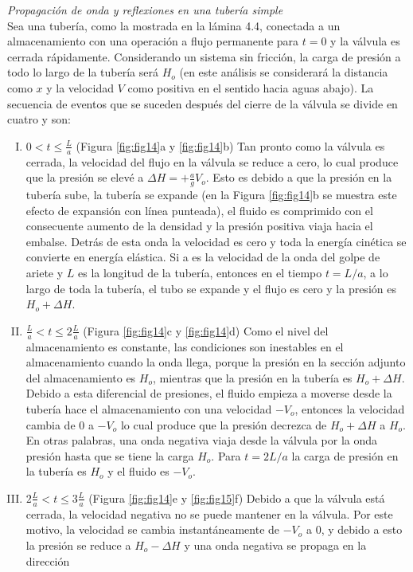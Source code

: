 \documentclass[letterpaper]{report}
\begin{document}
\emph{Propagación de onda y reflexiones en una tubería simple}\\
Sea una tubería, como la mostrada en la lámina 4.4, conectada a un almacenamiento con una operación a flujo permanente para $t=0$ y la válvula es cerrada rápidamente. 
Considerando un sistema sin fricción, la carga de presión a todo lo largo de la tubería será $H_o$ (en este análisis se considerará la distancia como $x$ y la velocidad 
$V$ como positiva en el sentido hacia aguas abajo).
La secuencia de eventos que se suceden después del cierre de la válvula se divide en cuatro y son:
\begin{enumerate}[I.]
	\item $0<t\le\frac{L}{a}$ (Figura \ref{fig:fig14}a y \ref{fig:fig14}b) Tan pronto como la válvula es cerrada, la velocidad del flujo en la válvula se reduce a cero, lo cual produce que la 
	presión se elevé a $\Delta H = + \frac{a}{g}V_o$. Esto es debido a que la presión en la tubería sube, la tubería se expande (en la Figura \ref{fig:fig14}b se muestra este efecto de 
	expansión con línea punteada), el fluido es comprimido con el consecuente aumento de la densidad y la presión positiva viaja hacia el embalse. Detrás de esta onda la 
	velocidad es cero y toda la energía cinética se convierte en energía elástica. Si a es la velocidad de la onda del golpe de ariete y $L$ es la longitud de la tubería, 
	entonces en el tiempo $t=L/a$, a lo largo de toda la tubería, el tubo se expande y el flujo es cero y la presión es $H_o+\Delta H$.
	\item $\frac{L}{a} < t \le 2\frac{L}{a}$ (Figura \ref{fig:fig14}c y \ref{fig:fig14}d) Como el nivel del almacenamiento es constante, las condiciones son inestables en el almacenamiento cuando 
	la onda llega, porque la presión en la sección adjunto del almacenamiento es $H_o$, mientras que la presión en la tubería es $H_o+\Delta H$. Debido a esta diferencial de presiones, 
	el fluido empieza a moverse desde la tubería hace el almacenamiento con una velocidad $-V_o$, entonces la velocidad cambia de 0 a $-V_o$ lo cual produce que la presión decrezca 
	de $H_o+\Delta H$ a $H_o$. En otras palabras, una onda negativa viaja desde la válvula por la onda presión hasta que se tiene la carga $H_o$. Para $t = 2L/a$ la carga de presión en 
	la tubería es $H_o$ y el fluido es $-V_o$.
	\item $2\frac{L}{a} < t \le 3\frac{L}{a}$ (Figura \ref{fig:fig14}e y \ref{fig:fig15}f) Debido a que la válvula está cerrada, la velocidad negativa no se puede mantener en la válvula. 
	Por este motivo, la velocidad se cambia instantáneamente de $-V_o$ a 0, y debido a esto la presión se reduce a $H_o-\Delta H$ y una onda negativa se propaga en la dirección 

\end{enumerate}
\end{document}
